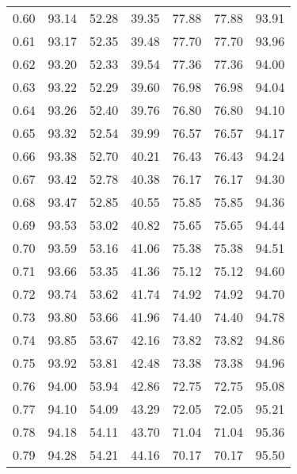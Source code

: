 \begin{tabular}{|c|c|c|c|c|c|c|}
      0.60 &     93.14 &     52.28 &      39.35 &   77.88 &      77.88 &         93.91 \\
      0.61 &     93.17 &     52.35 &      39.48 &   77.70 &      77.70 &         93.96 \\
      0.62 &     93.20 &     52.33 &      39.54 &   77.36 &      77.36 &         94.00 \\
      0.63 &     93.22 &     52.29 &      39.60 &   76.98 &      76.98 &         94.04 \\
      0.64 &     93.26 &     52.40 &      39.76 &   76.80 &      76.80 &         94.10 \\
      0.65 &     93.32 &     52.54 &      39.99 &   76.57 &      76.57 &         94.17 \\
      0.66 &     93.38 &     52.70 &      40.21 &   76.43 &      76.43 &         94.24 \\
      0.67 &     93.42 &     52.78 &      40.38 &   76.17 &      76.17 &         94.30 \\
      0.68 &     93.47 &     52.85 &      40.55 &   75.85 &      75.85 &         94.36 \\
      0.69 &     93.53 &     53.02 &      40.82 &   75.65 &      75.65 &         94.44 \\
      0.70 &     93.59 &     53.16 &      41.06 &   75.38 &      75.38 &         94.51 \\
      0.71 &     93.66 &     53.35 &      41.36 &   75.12 &      75.12 &         94.60 \\
      0.72 &     93.74 &     53.62 &      41.74 &   74.92 &      74.92 &         94.70 \\
      0.73 &     93.80 &     53.66 &      41.96 &   74.40 &      74.40 &         94.78 \\
      0.74 &     93.85 &     53.67 &      42.16 &   73.82 &      73.82 &         94.86 \\
      0.75 &     93.92 &     53.81 &      42.48 &   73.38 &      73.38 &         94.96 \\
      0.76 &     94.00 &     53.94 &      42.86 &   72.75 &      72.75 &         95.08 \\
      0.77 &     94.10 &     54.09 &      43.29 &   72.05 &      72.05 &         95.21 \\
      0.78 &     94.18 &     54.11 &      43.70 &   71.04 &      71.04 &         95.36 \\
      0.79 &     94.28 &     54.21 &      44.16 &   70.17 &      70.17 &         95.50 \\

\end{tabular}
